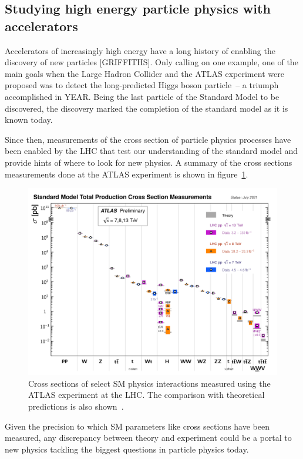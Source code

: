\subsection{Studying high energy particle physics with accelerators}

Accelerators of increasingly high energy have a long history of enabling the discovery of new particles [GRIFFITHS]. Only calling on one example, one of the main goals when the Large Hadron Collider and the ATLAS experiment were proposed was to detect the long-predicted Higgs boson particle~-- a triumph accomplished in YEAR. Being the last particle of the Standard Model to be discovered, the discovery marked the completion of the standard model as it is known today.

Since then, measurements of the cross section of particle physics processes have been enabled by the LHC that test our understanding of the standard model and provide hints of where to look for new physics. A summary of the cross sections measurements done at the ATLAS experiment is shown in figure~\ref{fig:atlas_cross_sections}.

\begin{figure}
    \centering
    \includegraphics[width = \textwidth]{figures/atlas_cross_sections.png}
    \caption{Cross sections of select SM physics interactions measured using the ATLAS experiment at the LHC. The comparison with theoretical predictions is also shown~\cite{atlas_public_web_sm}.}
    \label{fig:atlas_cross_sections}
\end{figure}

Given the precision to which SM parameters like cross sections have been measured, any discrepancy between theory and experiment could be a portal to new physics tackling the biggest questions in particle physics today. 

